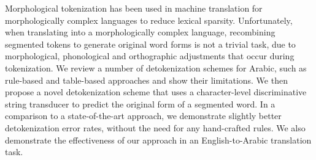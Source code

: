 Morphological tokenization has been used in machine translation for morphologically complex languages to reduce lexical sparsity. Unfortunately,
 when translating into a morphologically
 complex language, recombining segmented tokens to generate original word forms
 is not a trivial task, due to morphological, phonological and orthographic
 adjustments that occur during tokenization. We review a number of
 detokenization schemes for Arabic, such as rule-based and table-based
 approaches and show their limitations. We then propose a novel detokenization
 scheme that uses a character-level discriminative string transducer to predict
 the original form of a segmented word. In a comparison to a state-of-the-art
 approach, we demonstrate slightly better detokenization error rates, without
 the need for any hand-crafted rules. We also demonstrate the effectiveness of
 our approach in an English-to-Arabic translation task.

